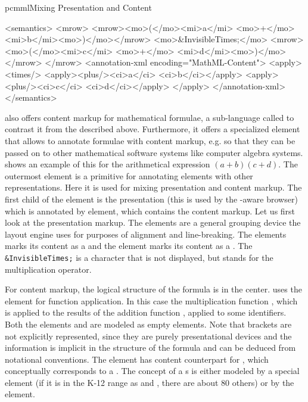\begin{myfig}{pcmml}{Mixing Presentation and Content {\mathml}}\footnotesize
\begin{boxedverbatim}
<semantics>
 <mrow>
  <mrow><mo>(</mo><mi>a</mi> <mo>+</mo> <mi>b</mi><mo>)</mo></mrow>
  <mo>&InvisibleTimes;</mo>
  <mrow><mo>(</mo><mi>c</mi> <mo>+</mo> <mi>d</mi><mo>)</mo></mrow>
 </mrow>
 <annotation-xml encoding="MathML-Content">
  <apply><times/>
   <apply><plus/><ci>a</ci> <ci>b</ci></apply>
   <apply><plus/><ci>c</ci> <ci>d</ci></apply>
  </apply>
 </annotation-xml>
</semantics>
\end{boxedverbatim}
\end{myfig}

{\mathml} also offers content markup for mathematical formulae, a sub-language
called {} to contrast it from the
{} described above. Furthermore, it offers a
specialized {} element that allows to annotate {\mathml}
formulae with content markup, e.g.  so that they can be passed on to other
mathematical software systems like computer algebra systems. {}
shows an example of this for the arithmetical expression $(a+b)(c+d)$. The
outermost {} element is a {\mathml} primitive for annotating
{\mathml} elements with other representations. Here it is used for mixing
presentation and content markup. The first child of the {}
element is the presentation (this is used by the {\mathml}-aware browser) which is
annotated by {} element, which contains the content
markup. Let us first look at the presentation markup. The {}
elements are a general grouping device the layout engine uses for purposes of
alignment and line-breaking. The {} elements marks its content as a
{} and the
{} element marks its content as a {}. The {} {\tt{{\&}InvisibleTimes;}} is a
character that is not displayed, but stands for the multiplication operator.


For content markup, the logical structure of the formula is in the center.
{\mathml} uses the {} element for function application. In this case the
multiplication function {}, which is applied to the
results of the addition
function {}, applied to some identifiers. Both the
elements {} and {} are modeled as empty elements. Note that brackets
are not explicitly represented, since they are purely presentational devices and
the information is implicit in the structure of the formula and can be deduced
from notational conventions.  The {} element has content counterpart
{} for {},
which conceptually corresponds to a {}. The concept of a {s} is either modeled by a special element (if
it is in the K-12 range as {} and {}, there are about
80 others) or by the {} element.

